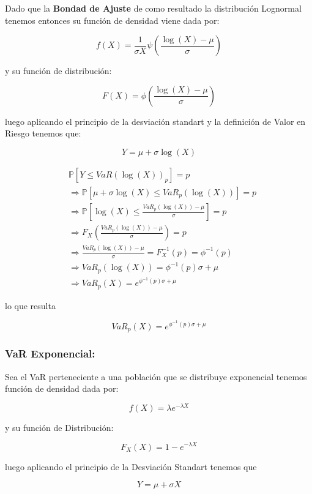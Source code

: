 \documentclass[10pt,]{article}
\begin{document}
Dado que la \textbf{Bondad de Ajuste} de como resultado la distribución
Lognormal tenemos entonces su función de densidad viene dada por:

\[f(X)=\frac{1}{\sigma X} \psi(\frac{\log(X)-\mu}{\sigma})\]

y su función de distribución:

\[F(X)=\phi(\frac{\log(X)-\mu}{\sigma})\]

luego aplicando el principio de la desviación standart y la definición
de Valor en Riesgo tenemos que:

\[Y = \mu + \sigma \log(X)\]

\[\begin{array}{rl}  
&\displaystyle \mathbb{P}[Y \leq VaR(\log(X))_p]=p\\
&\displaystyle \Rightarrow \mathbb{P}[\mu + \sigma \log(X) \leq VaR_p(\log(X))] = p\\
&\displaystyle \Rightarrow \mathbb{P}[\log(X) \leq \frac{VaR_{p}(\log(X))- \mu}{\sigma}] = p\\
&\displaystyle \Rightarrow F_X(\frac{VaR_{p}(\log(X))- \mu}{\sigma}) = p\\
&\displaystyle \Rightarrow \frac{VaR_{p}(\log(X))- \mu}{\sigma} = F_X^{-1}(p)=\phi^{-1}(p)\\
&\displaystyle \Rightarrow VaR_{p}(\log(X))=\phi^{-1}(p) \sigma + \mu\\
&\displaystyle \Rightarrow VaR_{p}(X)=e^{\phi^{-1}(p) \sigma + \mu}
\end{array}\]

lo que resulta

\[VaR_{p}(X)=e^{\phi^{-1}(p) \sigma + \mu}\]

\hypertarget{var-exponencial}{%
\subsubsection{\texorpdfstring{\textbf{VaR
Exponencial:}}{VaR Exponencial:}}\label{var-exponencial}}

Sea el VaR perteneciente a una población que se distribuye exponencial
tenemos función de densidad dada por:

\[f(X)= \lambda e^{-\lambda X}\]

y su función de Distribución:

\[F_X(X)= 1-e^{-\lambda X}\]

luego aplicando el principio de la Desviación Standart tenemos que

\[Y = \mu + \sigma X\]
\end{document}
